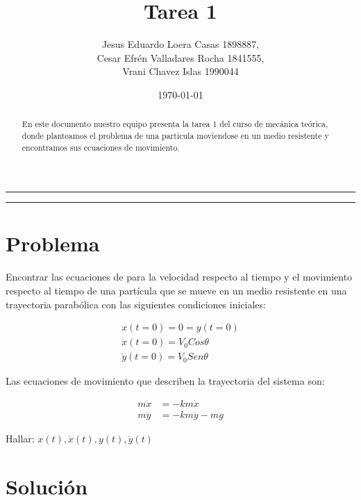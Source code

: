 \documentclass{article}
\title{Tarea 1}
\author{Jesus Eduardo Loera Casas 1898887,\\ Cesar Efrén Valladares Rocha 1841555,\\ Vrani Chavez Islas 1990044}
\date{\today}
\begin{document}


\tableofcontents			%

\begin{center}
	\rule[0mm]{150mm}{0.1mm}		%
	\end{center}
	
	
\begin{abstract}		%

	\noindent 				%
	En este documento nuestro equipo presenta la tarea 1 del curso de mecánica teórica, donde planteamos 
  el problema de una particula moviendose en un medio resistente y encontramos sus ecuaciones de 
  movimiento.
	\end{abstract}
	
\begin{center}
	\rule[0mm]{150mm}{0.1mm}
	\end{center}

  \section{Problema}		
                            
  Encontrar las ecuaciones de para la velocidad respecto al tiempo y el movimiento respecto
  al tiempo de una partícula que se mueve en un medio resistente en una trayectoria parabólica 
  con las siguientes condiciones iniciales:

  \begin{gather*}
    x(t=0)=0=y(t=0) \\
    \dot{x} (t=0) = V_{0} Cos\theta \\
    \dot{y} (t=0) = V_{0} Sen\theta 
  \end{gather*}

  Las ecuaciones de movimiento que describen la trayectoria del sistema son:

  \begin{align*}
    m\ddot{x} &= -km\dot{x} \\
    m\ddot{y} &= -km\dot{y}-mg
  \end{align*}

  Hallar: $ x(t), \dot{x} (t) , y(t), \dot{y} (t) $

\section{Solución}

 
\end{document}
